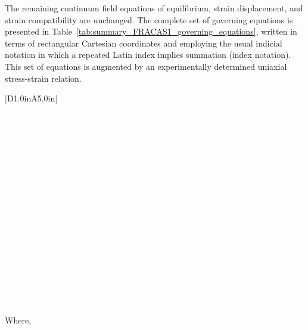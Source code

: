 The remaining continuum field equations of equilibrium, strain displacement, and strain
compatibility are unchanged. The complete set of governing equations is presented in
Table~\ref{tab:summary_FRACAS1_governing_equations}, written in terms of rectangular Cartesian
coordinates and employing the usual indicial notation in which a repeated Latin index implies
summation (index notation). This set of equations is augmented by an experimentally determined
uniaxial stress-strain relation.

\renewcommand{\captiontext}{Summary of FRACAS-I Governing Equations}
\begin{longtable}[c]{|D{1.0in}A{5.0in}|}
    \caption{\captiontext} \label{tab:summary_FRACAS1_governing_equations}                      \\  \hline
    \endfirsthead
    \caption{\captiontext~(continued)} \\   \hline
    \endhead
                                               \\  
                                  \\  \hline

                                             \\  
         \\  \hline
        
                                             \\  
            \\  \hline
        
                            \\  
             \\  
           \\ \hline
        
                                   \\  
         \\ \hline
\end{longtable}
Where,

